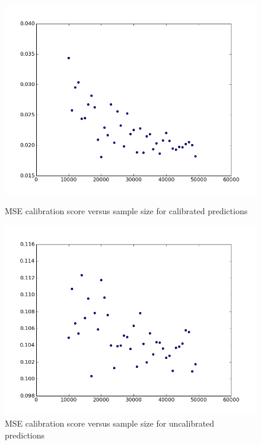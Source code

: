 \begin{figure}[t]
  \includegraphics[width=\linewidth]{calibrated_sampleSize_score.png}
  \caption{MSE calibration score versus sample size for calibrated predictions}
  \label{fig:calibrated_samplesize_score}
\endminipage\hfill
{}
  \includegraphics[width=\linewidth]{uncalibrated_sampleSize_score.png}
  \caption{MSE calibration score versus sample size for uncalibrated predictions}
  \label{fig:uncalibrated_samplesize_score}  
\endminipage
\end{figure}


